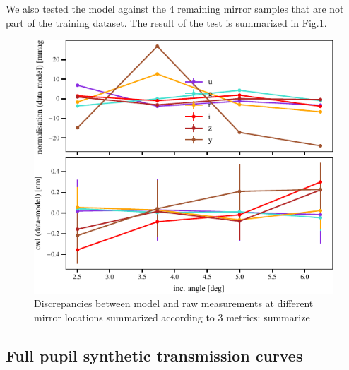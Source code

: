 We also tested the model against the 4 remaining mirror samples that
are not part of the training dataset. The result of the test is
summarized in Fig.\ref{fig:metrics}.

\begin{figure}
  \centering
  \includegraphics[width=1\linewidth]{fig/metrics.pdf}
  \caption{Discrepancies between model and raw measurements at different mirror locations summarized according to 3 metrics: summarize}
  \label{fig:metrics}
\end{figure}

\subsection{Full pupil synthetic transmission curves}

